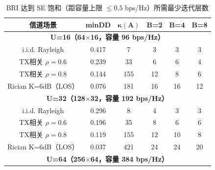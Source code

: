     \begin{table}[H]
        \centering
        \caption{BRI 达到 SE 饱和（距容量上限 $\le0.5$ bps/Hz）所需最少迭代层数}
        \label{tab:bri-convergence} \small
        \begin{tabular}{c|c|c|c|c|c}
            \toprule \textbf{信道场景}                                                 & \textbf{minDD} & $\bm{\kappa(\bm{A})}$ & \textbf{B=2} & \textbf{B=4} & \textbf{B=8} \\
            \midrule \multicolumn{6}{c}{\textbf{U=16（64$\times$16，容量 96 bps/Hz）}}   \\
            \midrule i.i.d. Rayleigh                                               & 0.417          & 7                     & 3            & 3            & 3            \\
            TX相关 $\rho=0.6$                                                        & 0.239          & 33                    & 6            & 6            & 4            \\
            TX相关 $\rho=0.8$                                                        & 0.144          & 155                   & 12           & 8            & 6            \\
            Rician K=6dB（LOS）                                                      & 0.076          & 181                   & 16           & 16           & 12           \\
            \midrule \multicolumn{6}{c}{\textbf{U=32（128$\times$32，容量 192 bps/Hz）}} \\
            \midrule i.i.d. Rayleigh                                               & 0.296          & 8                     & 4            & 3            & 3            \\
            TX相关 $\rho=0.6$                                                        & 0.196          & 35                    & 8            & 6            & 6            \\
            TX相关 $\rho=0.8$                                                        & 0.119          & 155                   & 12           & 10           & 8            \\
            Rician K=6dB（LOS）                                                      & 0.037          & 421                   & 24           & 24           & 20           \\
            \midrule \multicolumn{6}{c}{\textbf{U=64（256$\times$64，容量 384 bps/Hz）}} \\

\end{tabular}
\end{table}
